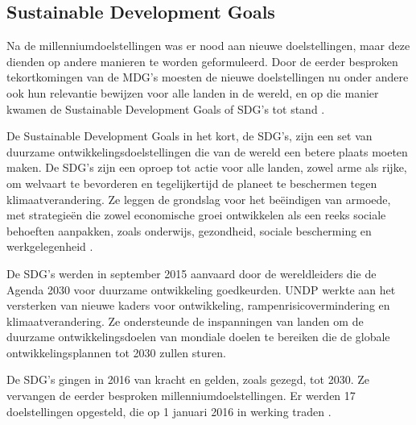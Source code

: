 \subsection{Sustainable Development Goals}
Na de millenniumdoelstellingen was er nood aan nieuwe doelstellingen, maar deze dienden op andere manieren te worden geformuleerd. Door de eerder besproken tekortkomingen van de MDG's moesten de nieuwe doelstellingen nu onder andere ook hun relevantie bewijzen voor alle landen in de wereld, en op die manier kwamen de Sustainable Development Goals of SDG's tot stand \autocite{VN2015}.

De Sustainable Development Goals in het kort, de SDG's, zijn een set van duurzame ontwikkelingsdoelstellingen die van de wereld een betere plaats moeten maken. De SDG’s zijn een oproep tot actie voor alle landen, zowel arme als rijke, om welvaart te bevorderen en tegelijkertijd de planeet te beschermen tegen klimaatverandering. Ze leggen de grondslag voor het beëindigen van armoede, met strategieën die zowel economische groei ontwikkelen als een reeks sociale behoeften aanpakken, zoals onderwijs, gezondheid, sociale bescherming en werkgelegenheid \autocite{VerenigdeNaties2004}.


De SDG's werden in september 2015 aanvaard door de wereldleiders die de Agenda 2030 voor duurzame ontwikkeling goedkeurden. UNDP werkte aan het versterken van nieuwe kaders voor ontwikkeling, rampenrisicovermindering en klimaatverandering. Ze ondersteunde de inspanningen van landen om de duurzame ontwikkelingsdoelen van mondiale doelen te bereiken die de globale ontwikkelingsplannen tot 2030 zullen sturen.

De SDG's gingen in 2016 van kracht en gelden, zoals gezegd, tot 2030. Ze vervangen de eerder besproken millenniumdoelstellingen. Er werden 17 doelstellingen opgesteld, die op 1 januari 2016 in werking traden \autocite{DevelopmentProgram2020}.
 
